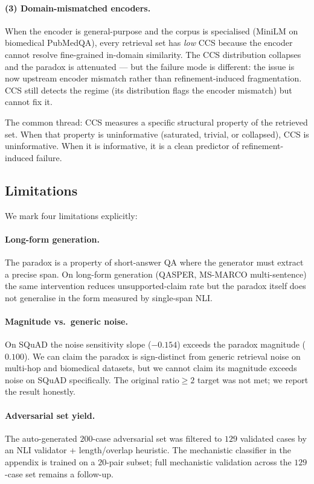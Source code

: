 \paragraph{(3) Domain-mismatched encoders.}
When the encoder is general-purpose and the corpus is specialised
(MiniLM on biomedical PubMedQA), every retrieval set has \emph{low}
CCS because the encoder cannot resolve fine-grained in-domain
similarity. The CCS distribution collapses and the paradox is
attenuated --- but the failure mode is different: the issue is now
upstream encoder mismatch rather than refinement-induced
fragmentation. CCS still detects the regime (its distribution flags
the encoder mismatch) but cannot fix it.

The common thread: CCS measures a specific structural property of the
retrieved set. When that property is uninformative (saturated, trivial,
or collapsed), CCS is uninformative. When it is informative, it is a
clean predictor of refinement-induced failure.

\subsection{Limitations}
\label{sec:discussion:limits}

We mark four limitations explicitly:

\paragraph{Long-form generation.} The paradox is a property of
short-answer QA where the generator must extract a precise span. On
long-form generation (QASPER, MS-MARCO multi-sentence) the same
intervention reduces unsupported-claim rate but the paradox itself
does not generalise in the form measured by single-span NLI.

\paragraph{Magnitude vs.\ generic noise.} On SQuAD the noise sensitivity
slope ($-0.154$) exceeds the paradox magnitude ($0.100$). We can
claim the paradox is sign-distinct from generic retrieval noise on
multi-hop and biomedical datasets, but we cannot claim its magnitude
exceeds noise on SQuAD specifically. The original $\textrm{ratio} \geq 2$
target was not met; we report the result honestly.

\paragraph{Adversarial set yield.} The auto-generated $200$-case
adversarial set was filtered to $129$ validated cases by an NLI
validator + length/overlap heuristic. The mechanistic classifier in
the appendix is trained on a $20$-pair subset; full mechanistic
validation across the $129$-case set remains a follow-up.

